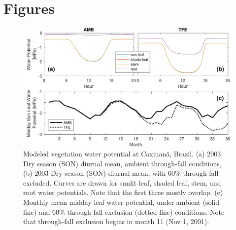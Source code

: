 \documentclass[draft,linenumbers]{agujournal}
\begin{document}
\clearpage    

\section{Figures}
  \begin{figure}[h]
     \centering
     \includegraphics[width=30pc]{../figs2/fig2.pdf}
     \caption{Modeled vegetation water potential at  Caxiuan\~a, Brazil.
     (a) 2003 Dry season (SON) diurnal mean, ambient through-fall conditions,
     (b) 2003 Dry season (SON) diurnal mean, with 60\% through-fall excluded.
     Curves are drawn for sunlit leaf, shaded leaf, stem, and root water potentials. Note that the first three mostly overlap.
     (c) Monthly mean midday leaf water potential, under ambient (solid line) and 60\% through-fall exclusion (dotted line) conditions.
     Note that through-fall exclusion begins in month 11 (Nov 1, 2001).
     }
     \label{fig:vwp}
  \end{figure}
  
\end{document}
